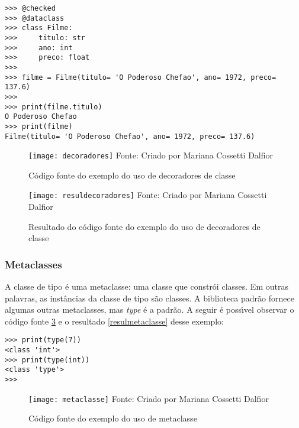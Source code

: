 \begin{lstlisting}
>>> @checked
>>> @dataclass
>>> class Filme:
>>> 	titulo: str
>>> 	ano: int
>>> 	preco: float
>>>
>>> filme = Filme(titulo= 'O Poderoso Chefao', ano= 1972, preco= 137.6)
>>> 
>>> print(filme.titulo) 
O Poderoso Chefao
>>> print(filme)
Filme(titulo= 'O Poderoso Chefao', ano= 1972, preco= 137.6)
\end{lstlisting}

\begin{figure}[H]
	\begin{center}
		\caption{C\'{o}digo fonte do exemplo do uso de decoradores de classe} \label{fontedecoradores}
		\texttt{[image: decoradores]} 
		\newline
		Fonte: Criado por Mariana Cossetti Dalfior
	\end{center}
\end{figure}

\begin{figure}[H]
	\begin{center}
		\caption{Resultado do c\'{o}digo fonte do exemplo do uso de decoradores de classe} \label{resuldecoradores}
		\texttt{[image: resuldecoradores]} 
		\newline
		Fonte: Criado por Mariana Cossetti Dalfior
	\end{center}
\end{figure}

		\subsubsection{Metaclasses}

A classe de tipo \'{e} uma metaclasse: uma classe que constr\'{o}i classes. Em outras palavras, as inst\^{a}ncias da classe de tipo s\~{a}o classes. A biblioteca padr\~{a}o fornece algumas outras metaclasses, mas \textsl{type} \'{e} a padr\~{a}o. A seguir \'{e} poss\'{\i}vel observar o c\'{o}digo fonte \ref{fontemetaclasse} e o resultado \ref{resulmetaclasse} desse exemplo:

\begin{lstlisting}
>>> print(type(7))
<class 'int'>
>>> print(type(int))
<class 'type'>
>>>	  
\end{lstlisting}

\begin{figure}[H]
	\begin{center}
		\caption{C\'{o}digo fonte do exemplo do uso de metaclasse} \label{fontemetaclasse}
		\texttt{[image: metaclasse]} 
		\newline
		Fonte: Criado por Mariana Cossetti Dalfior
	\end{center}
\end{figure}

